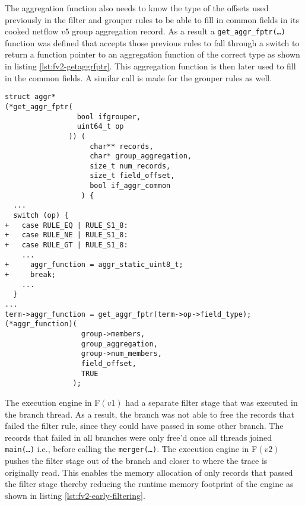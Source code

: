 The aggregation function also needs to know the type of the offsets used
previously in the filter and grouper rules to be able to fill in common fields
in its cooked netflow $v5$ group aggregation record. As a result
 a
\texttt{get\_aggr\_fptr(\ldots)} function was defined that accepts those
previous rules to fall through a switch to return a function pointer to an
aggregation function of the correct type as shown in listing
\ref{lst:fv2-getaggrfptr}. This aggregation function is then later used to
fill in the common fields. A similar call is made for the grouper rules as
well.

\begin{lstlisting}
struct aggr*
(*get_aggr_fptr(
                 bool ifgrouper,
                 uint64_t op
               )) (
                    char** records,
                    char* group_aggregation,
                    size_t num_records,
                    size_t field_offset,
                    bool if_aggr_common
                  ) {
  ...
  switch (op) {
+   case RULE_EQ | RULE_S1_8:
+   case RULE_NE | RULE_S1_8:
+   case RULE_GT | RULE_S1_8:
    ...
+     aggr_function = aggr_static_uint8_t;
+     break;
    ...
  }
...
term->aggr_function = get_aggr_fptr(term->op->field_type);
(*aggr_function)(
                  group->members,
                  group_aggregation,
                  group->num_members,
                  field_offset,
                  TRUE
                );
\end{lstlisting}


The execution engine in F$(v1)$ had a separate filter stage that was executed
in the branch thread. As a result, the branch  was not able to free the
records that failed the filter rule, since they could have passed in some
other branch. The records that failed in all branches were only free'd
 once all threads joined \texttt{main(\ldots)}
i.e., before calling the \texttt{merger(\ldots)}. The execution engine in
F$(v2)$ pushes the filter stage out of the branch and closer to where the
trace is originally read. This enables the memory allocation of only records
that passed the filter stage thereby reducing the runtime memory footprint of
the engine as shown in listing \ref{lst:fv2-early-filtering}.

